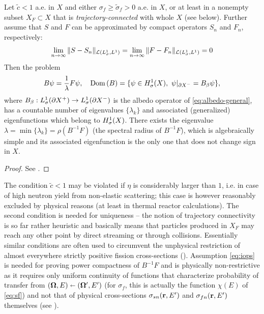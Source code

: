 \begin{theorem}\label{thm:eigenvalue}
	Let $\tilde{c} < 1$ a.e. in $X$ and either $\sigma_f \geq \tilde{\sigma}_f > 0$ a.e. in $X$, or at least in a nonempty
	subset $X_F \subset X$ that is \textit{trajectory-connected} with whole $X$ (see below). 
	Further assume that $S$ and $F$ can be approximated by compact operators $S_n$ and $F_n$, respectively:
\begin{equation}\label{eq:iops}
	\lim_{n\to\infty}\Vert S-S_n\Vert_{\mathcal{L}(\Lp[1]_{\sigma},\Lp[1])} = 
	\lim_{n\to\infty}\Vert F-F_n\Vert_{\mathcal{L}(\Lp[1]_{\sigma},\Lp[1])} = 0
\end{equation}
Then the problem
\begin{equation*}
     B\psi = \frac{1}{\lambda} F\psi,\quad
     \Dom{B} = \{\psi\in \Hp[1]_{\sigma}(X),\ \psi\vert_{\pX[-]} = \albedoop\psi\},
\end{equation*}
where $\albedoop : \Lp[1]_{\sigma}(\pX[+]) \to \Lp[1]_{\sigma}(\pX[-])$ is the albedo operator of
\eqref{eq:albedo-general}, has a countable number of eigenvalues $\{\lambda_k\}$ and associated (generalized)
eigenfunctions which belong to $\Hp[1]_{\sigma}(X)$.
There exists the eigenvalue $\lambda = \min \{\lambda_k\} = \rho(B^{-1}F)$ (the spectral radius of $B^{-1}F$), which is
algebraically simple and its associated eigenfunction is the only one that does not change sign in $X$.
\end{theorem}
\begin{proof}
See \cite{Sanchez3}.
\end{proof}
The condition $\tilde{c} < 1$ may be violated if $\eta$ is considerably larger than $1$, i.e. in case of high
neutron yield from non-elastic scattering; this case is however reasonably excluded by physical reasons (at least in thermal
reactor calculations).
The second condition is needed for uniqueness -- the notion of trajectory connectivity is so far rather heuristic and basically means that particles 
produced in $X_F$ may reach any other point by direct streaming or through collisions. Essentially similar conditions 
are often used to circumvent the unphysical restriction of almost everywhere strictly positive fission cross-sections 
(\cite{MokhtarKharroubi,AllaireHomogenization}). Assumption \eqref{eq:iops} is needed for proving power compactness of
$B^{-1}F$ and is physically non-restrictive as it requires only uniform continuity of functions that
characterize probability of transfer from $(\bomega, E) \sla (\bomega',E')$ (for $\sigma_f$, this is actually the
function $\chi(E)$ of \eqref{eq:sf}) and not that of physical cross-sections $\sigma_{sn}(\br,E')$ and
$\sigma_{fn}(\br,E')$ themselves (see \cite{Sanchez3}).

